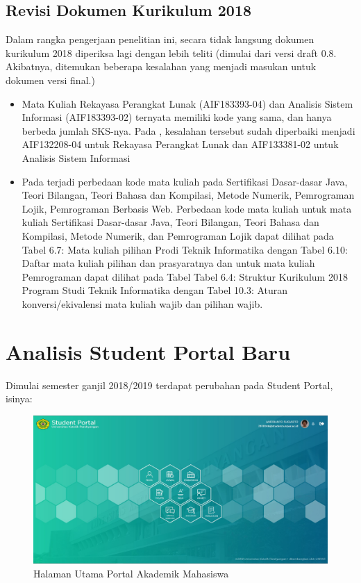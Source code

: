 \subsection{Revisi Dokumen Kurikulum 2018}
\label{subbab:revisidokumenkurikulum2018}

Dalam rangka pengerjaan penelitian ini, secara tidak langsung dokumen kurikulum 2018 diperiksa lagi dengan lebih teliti (dimulai dari versi draft 0.8. Akibatnya, ditemukan beberapa kesalahan yang menjadi masukan untuk dokumen versi final.)
\begin{itemize}
	\item Mata Kuliah Rekayasa Perangkat Lunak (AIF183393-04) dan Analisis Sistem Informasi (AIF183393-02) ternyata memiliki kode yang sama, dan hanya berbeda jumlah SKS-nya. Pada \cite{dokumenkurikulum2018}, kesalahan tersebut sudah diperbaiki menjadi AIF132208-04 untuk Rekayasa Perangkat Lunak dan AIF133381-02 untuk Analisis Sistem Informasi
	\item Pada \cite{dokumenkurikulum2018} terjadi perbedaan kode mata kuliah pada Sertifikasi Dasar-dasar Java, Teori Bilangan, Teori Bahasa dan Kompilasi, Metode Numerik, Pemrograman Lojik, Pemrograman Berbasis Web. Perbedaan kode mata kuliah untuk mata kuliah Sertifikasi Dasar-dasar Java, Teori Bilangan, Teori Bahasa dan Kompilasi, Metode Numerik, dan Pemrograman Lojik dapat dilihat pada \cite{dokumenkurikulum2018} Tabel 6.7: Mata kuliah pilihan Prodi Teknik Informatika dengan Tabel 6.10: Daftar mata kuliah pilihan dan prasyaratnya dan untuk mata kuliah Pemrograman dapat dilihat pada \cite{dokumenkurikulum2018} Tabel Tabel 6.4: Struktur Kurikulum 2018 Program Studi Teknik Informatika dengan Tabel 10.3: Aturan konversi/ekivalensi mata kuliah wajib dan pilihan wajib. 
\end{itemize}

\section{Analisis Student Portal Baru}

Dimulai semester ganjil 2018/2019 terdapat perubahan pada Student Portal, isinya:
\begin{figure}[H]
\centering
\includegraphics[scale=0.3]{Gambar/studentportal_home}
\caption{Halaman Utama Portal Akademik Mahasiswa}
\label{fig:studentportal_home}
\end{figure}

